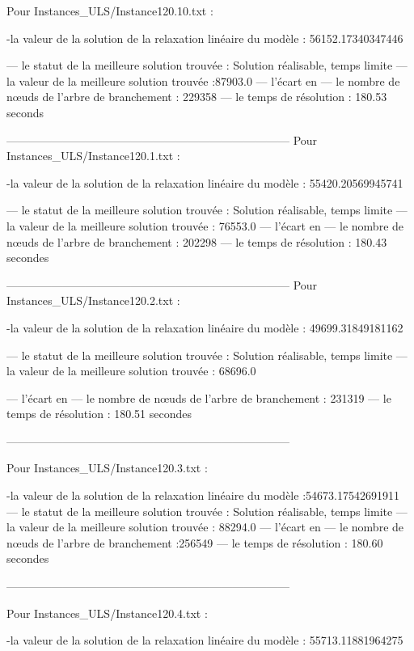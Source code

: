Pour Instances_ULS/Instance120.10.txt :


-la valeur de la solution de la relaxation linéaire du modèle : 56152.17340347446

— le statut de la meilleure solution trouvée : Solution réalisable, temps limite
— la valeur de la meilleure solution trouvée :87903.0 
— l’écart en %
— le nombre de nœuds de l’arbre de branchement : 229358
— le temps de résolution : 180.53 seconds


---------------------------------------------------------------------------
Pour Instances_ULS/Instance120.1.txt :


-la valeur de la solution de la relaxation linéaire du modèle : 55420.20569945741


— le statut de la meilleure solution trouvée : Solution réalisable, temps limite
— la valeur de la meilleure solution trouvée : 76553.0
— l’écart en %
— le nombre de nœuds de l’arbre de branchement : 202298
— le temps de résolution : 180.43 secondes


---------------------------------------------------------------------------
Pour Instances_ULS/Instance120.2.txt :


-la valeur de la solution de la relaxation linéaire du modèle : 49699.31849181162

— le statut de la meilleure solution trouvée : Solution réalisable, temps limite
— la valeur de la meilleure solution trouvée : 68696.0

— l’écart en %
— le nombre de nœuds de l’arbre de branchement : 231319
— le temps de résolution : 180.51 secondes


---------------------------------------------------------------------------

Pour Instances_ULS/Instance120.3.txt :


-la valeur de la solution de la relaxation linéaire du modèle :54673.17542691911
— le statut de la meilleure solution trouvée : Solution réalisable, temps limite
— la valeur de la meilleure solution trouvée : 88294.0
— l’écart en %
— le nombre de nœuds de l’arbre de branchement :256549
— le temps de résolution : 180.60 secondes


---------------------------------------------------------------------------


Pour Instances_ULS/Instance120.4.txt :



-la valeur de la solution de la relaxation linéaire du modèle : 55713.11881964275

